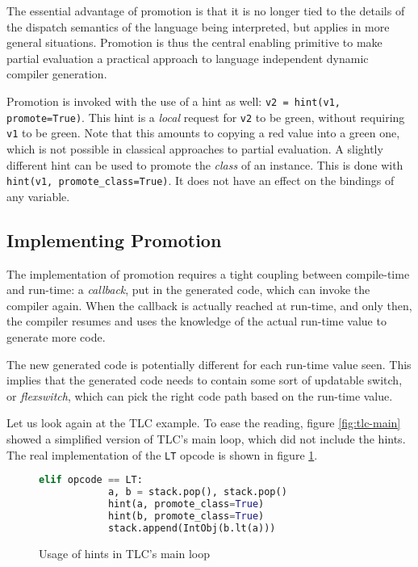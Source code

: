 The essential advantage of promotion is that it is no longer tied to the details of
the dispatch semantics of the language being interpreted, but applies in
more general situations.  Promotion is thus the central enabling
primitive to make partial evaluation a practical approach to language
independent dynamic compiler generation.

Promotion is invoked with the use of a hint as well:
\texttt{v2 = hint(v1, promote=True)}.
This hint is a \emph{local} request for \texttt{v2} to be green, without
requiring \texttt{v1} to be green.  Note that this amounts to copying
a red value into a green one, which is not possible in classical
approaches to partial evaluation. A slightly different hint can be used to
promote the \emph{class} of an instance. This is done with \lstinline{hint(v1,
promote_class=True)}. It does not have an effect on the bindings of any
variable.


\subsection{Implementing Promotion}

The implementation of promotion requires a tight coupling between
compile-time and run-time: a \emph{callback}, put in the generated code,
which can invoke the compiler again.  When the callback is actually
reached at run-time, and only then, the compiler resumes and uses the
knowledge of the actual run-time value to generate more code.

The new generated code is potentially different for each run-time value
seen.  This implies that the generated code needs to contain some sort
of updatable switch, or \emph{flexswitch}, which can pick the right code path based on the
run-time value.

Let us look again at the TLC example.  To ease the reading, figure
\ref{fig:tlc-main} showed a simplified version of TLC's main loop, which did
not include the hints.  The real implementation of the \lstinline{LT} opcode
is shown in figure \ref{fig:tlc-main-hints}.

\begin{figure}[h]
\begin{center}
\begin{lstlisting}[language=Python]
        elif opcode == LT:
            a, b = stack.pop(), stack.pop()
            hint(a, promote_class=True)
            hint(b, promote_class=True)
            stack.append(IntObj(b.lt(a)))
\end{lstlisting}
\caption{Usage of hints in TLC's main loop}
\label{fig:tlc-main-hints}
\end{center}
\end{figure}

